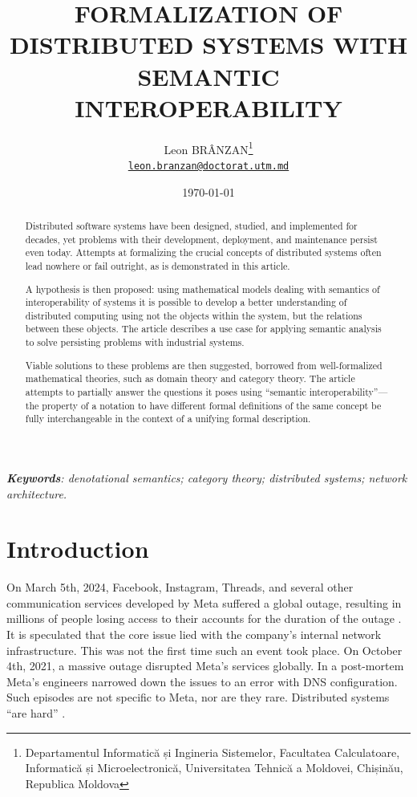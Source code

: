 \documentclass{article}
\title{FORMALIZATION OF DISTRIBUTED SYSTEMS WITH SEMANTIC
INTEROPERABILITY}
\author{Leon BRÂNZAN\thanks{Departamentul Informatică și Ingineria Sistemelor, Facultatea Calculatoare, Informatică și Microelectronică, Universitatea Tehnică a Moldovei, Chișinău, Republica Moldova} \\ \href{mailto:leon.branzan@doctorat.utm.md}{\texttt{leon.branzan@doctorat.utm.md}}}
\date{\today}
\begin{document}
\maketitle

\begin{abstract}
    Distributed software systems have been designed, studied, and implemented for decades, yet problems with their development, deployment, and maintenance persist even today. Attempts
    at formalizing the crucial concepts of distributed systems often lead nowhere or fail outright, as is
    demonstrated in this article.

    A hypothesis is then proposed: using mathematical models dealing with semantics of interoperability
    of systems it is possible to develop a better understanding of distributed computing using not the objects
    within the system, but the relations between these objects. The article describes a use case for applying
    semantic analysis to solve persisting problems with industrial systems.

    Viable solutions to these problems are then suggested, borrowed from well-formalized
    mathematical theories, such as domain theory and category theory. The article attempts to
    partially answer the questions it poses using “semantic interoperability”---the property of a
    notation to have different formal definitions of the same concept be fully interchangeable in the
    context of a unifying formal description. 
    \end{abstract}
    \textit{\textbf{Keywords}: denotational semantics; category theory; distributed systems; network architecture.}

\tableofcontents

\newpage

\section*{Introduction}

On March 5th, 2024, Facebook, Instagram, Threads, and several other communication
services developed by Meta suffered a global outage, resulting in millions of people losing access
to their accounts for the duration of the outage \cite{Rita}. It is speculated that the core issue lied with the
company’s internal network infrastructure. This was not the first time such an event took place.
On October 4th, 2021, a massive outage disrupted Meta’s services globally. In a post-mortem \cite{Janardhan}
Meta’s engineers narrowed down the issues to an error with DNS configuration. Such episodes are
not specific to Meta, nor are they rare. Distributed systems “are hard” \cite{Kingsbury}.
\end{document}
